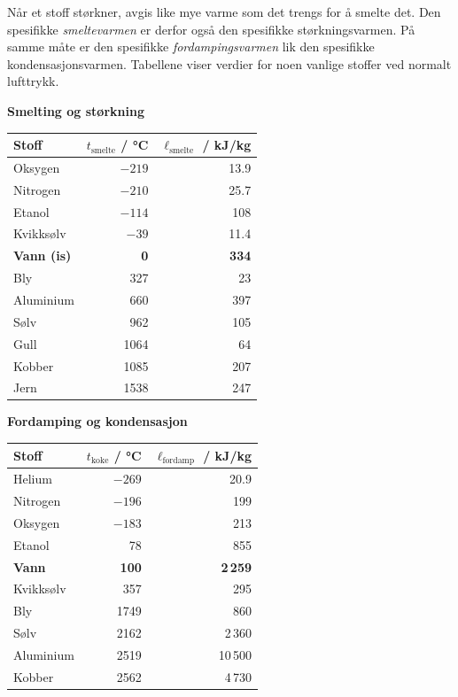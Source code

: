 Når et stoff størkner, avgis like mye varme som det trengs for å smelte det. Den spesifikke \emph{smeltevarmen} er derfor også den spesifikke størkningsvarmen. På samme måte er den spesifikke \emph{fordampingsvarmen} lik den spesifikke kondensasjonsvarmen. Tabellene viser verdier for noen vanlige stoffer ved normalt lufttrykk.

\begin{center}
\small
\begin{minipage}[t]{0.47\linewidth}
\centering
\textbf{Smelting og størkning}\\[3pt]
\begin{tabular}{lrr}
\hline
\textbf{Stoff} & $t_\text{smelte}$ / \si{\celsius} & $\ell_\text{smelte}$ / \si{kJ/kg} \\
\hline
Oksygen     & $-219$ & 13.9 \\
Nitrogen    & $-210$ & 25.7 \\
Etanol      & $-114$ & 108 \\
Kvikksølv   & $-39$  & 11.4 \\
\textbf{Vann (is)} & \textbf{0} & \textbf{334} \\
Bly         & 327    & 23 \\
Aluminium   & 660    & 397 \\
Sølv        & 962    & 105 \\
Gull        & 1064   & 64 \\
Kobber      & 1085   & 207 \\
Jern        & 1538   & 247 \\
\hline
\end{tabular}
\end{minipage}%
\hfill
\begin{minipage}[t]{0.49\linewidth}
\centering
\textbf{Fordamping og kondensasjon}\\[3pt]
\begin{tabular}{lrr}
\hline
\textbf{Stoff} & $t_\text{koke}$ / \si{\celsius} & $\ell_\text{fordamp}$ / \si{kJ/kg} \\
\hline
Helium      & $-269$ & 20.9 \\
Nitrogen    & $-196$ & 199 \\
Oksygen     & $-183$ & 213 \\
Etanol      & 78     & 855 \\
\textbf{Vann} & \textbf{100} & \textbf{2\,259} \\
Kvikksølv   & 357    & 295 \\
Bly         & 1749   & 860 \\
Sølv        & 2162   & 2\,360 \\
Aluminium   & 2519   & 10\,500 \\
Kobber      & 2562   & 4\,730 \\
\hline
\end{tabular}
\end{minipage}
\end{center}

